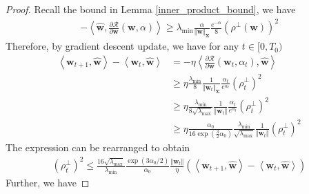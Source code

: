 \documentclass[pdflatex,sn-basic]{sn-jnl}%
\theoremstyle{thmstyleone}%
\begin{document}
\begin{appendices}
\begin{proof}
  Recall the bound in Lemma \ref{inner_product_bound}, we have 
  \begin{equation*}
    \begin{aligned}
      - \left\langle \hat{\mathbf{w}}, \frac{\partial \mathcal{R}}{\partial \mathbf{w}} \left(\mathbf{w}, \alpha\right) \right\rangle 
      \ge 
      \lambda_{\min} \frac{\alpha }{\Vert \mathbf{w} \Vert_{\mathbf{\Sigma}}}
      \frac{e^{-\alpha}}{8}
      \left(
        \rho^{\perp}\left(\mathbf{w}\right)
      \right)^2 
  \end{aligned}
  \end{equation*}
  Therefore, by gradient descent update, we have for any $t \in [0, T_0)$
  \begin{equation*}
  \begin{aligned}
    \left\langle \mathbf{w}_{t+1}, \hat{\mathbf{w}} \right\rangle - \left\langle \mathbf{w}_{t}, \hat{\mathbf{w}} \right\rangle 
    & = 
    -
    \eta \left\langle 
      \frac{\partial \mathcal{R}}{\partial \mathbf{w}} \left(\mathbf{w}_t, \alpha_t\right)
    , \hat{\mathbf{w}} \right\rangle 
    \\ & \ge 
    \eta \frac{\lambda_{\min}}{8}
    \frac{1}{\Vert \mathbf{w}_t \Vert_{\mathbf{\Sigma}}}
      \frac{\alpha_t }{ e^{\alpha_t}}
    \left(
      \rho_t^{\perp}
    \right)^2 
    \\ & \ge 
    \eta \frac{\lambda_{\min}}{8 \sqrt{\lambda_{\max}}}
    \frac{1}{\Vert \mathbf{w}_t \Vert}
      \frac{\alpha_t }{ e^{\alpha_t}}
    \left(
      \rho_t^{\perp}
    \right)^2 
    \\ & \ge 
    \eta \frac{\alpha_0}{16 \exp\left(\frac{3}{2}\alpha_0\right)} \frac{\lambda_{\min}}{\sqrt{\lambda_{\max}}}
    \frac{1}{\Vert \mathbf{w}_t \Vert}
    \left(
      \rho_t^{\perp}
    \right)^2 
  \end{aligned}
  \end{equation*}
  The expression can be rearranged to obtain
  \begin{equation*}
  \begin{aligned}
    \left(
      \rho_t^{\perp}
    \right)^2 
    \le 
    \frac{16 \sqrt{\lambda_{\max}} }{\lambda_{\min}}
    \frac{ \exp \left({3 \alpha_0 /2 }\right)}{\alpha_0 }
    \frac{\Vert \mathbf{w}_t \Vert}{\eta}
    \left(
      \left\langle \mathbf{w}_{t+1}, \hat{\mathbf{w}} \right\rangle - \left\langle \mathbf{w}_{t}, \hat{\mathbf{w}} \right\rangle 
    \right)
  \end{aligned}
  \end{equation*}
  Further, we have 

\end{proof}
\end{appendices}
\end{document}
